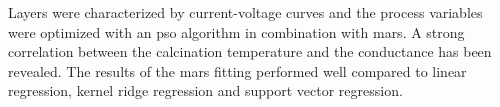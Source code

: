 Layers were characterized by current-voltage curves and the process variables were optimized with an \gls{pso} algorithm in combination with \gls{mars}.
A strong correlation between the calcination temperature and the conductance has been revealed. 
The results of the \gls{mars} fitting performed well compared to linear regression, kernel ridge regression and support vector regression.
